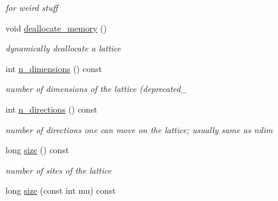 \begin{CompactItemize}
\begin{CompactList}\small\item\em for weird stuff \item\end{CompactList}\item 
\hypertarget{classmdp__lattice_f5407cf7f7d5eded3870abf0515e110d}{
void \hyperlink{classmdp__lattice_f5407cf7f7d5eded3870abf0515e110d}{deallocate\_\-memory} ()}
\label{classmdp__lattice_f5407cf7f7d5eded3870abf0515e110d}

\begin{CompactList}\small\item\em dynamically deallocate a lattice \item\end{CompactList}\item 
\hypertarget{classmdp__lattice_7e99975b0536e5f46acc8b72778c077f}{
int \hyperlink{classmdp__lattice_7e99975b0536e5f46acc8b72778c077f}{n\_\-dimensions} () const }
\label{classmdp__lattice_7e99975b0536e5f46acc8b72778c077f}

\begin{CompactList}\small\item\em number of dimensions of the lattice (deprecated\_\- \item\end{CompactList}\item 
\hypertarget{classmdp__lattice_a8452324840f85cf188ce7fffe488d98}{
int \hyperlink{classmdp__lattice_a8452324840f85cf188ce7fffe488d98}{n\_\-directions} () const }
\label{classmdp__lattice_a8452324840f85cf188ce7fffe488d98}

\begin{CompactList}\small\item\em number of directions one can move on the lattice; usually same as ndim \item\end{CompactList}\item 
\hypertarget{classmdp__lattice_91010f274b1b287bad36f8de1e4d960f}{
long \hyperlink{classmdp__lattice_91010f274b1b287bad36f8de1e4d960f}{size} () const }
\label{classmdp__lattice_91010f274b1b287bad36f8de1e4d960f}

\begin{CompactList}\small\item\em number of sites of the lattice \item\end{CompactList}\item 
\hypertarget{classmdp__lattice_f412af0a9aad0b3bfb28675e6c352080}{
long \hyperlink{classmdp__lattice_f412af0a9aad0b3bfb28675e6c352080}{size} (const int mu) const }
\label{classmdp__lattice_f412af0a9aad0b3bfb28675e6c352080}


\end{CompactItemize}
